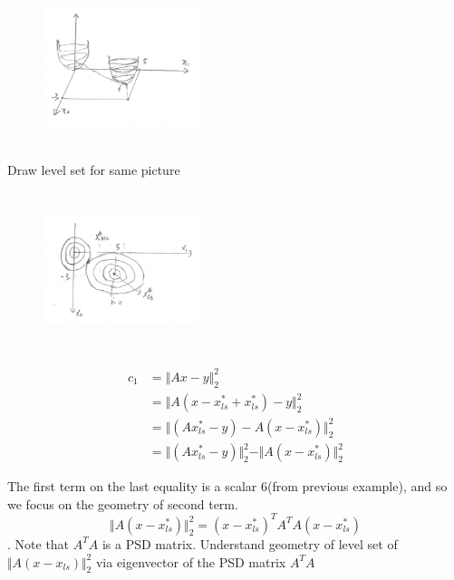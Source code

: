 \begin{figure}
	\centering
	\includegraphics[width=1.8in,height=1.8in]{figures/ch06/ch06-06.jpg}
\end{figure}

\newpage
Draw level set for same picture
\begin{figure}
	\centering
	\includegraphics[width=1.8in,height=1.8in]{figures/ch06/ch06-07.jpg}
\end{figure}

\begin{align*}
c_1
&=\Vert Ax-y\Vert^2_2\\
&=\Vert A(x-x_{ls}^*+x_{ls}^*)-y\Vert^2_2\\
&=\Vert (Ax_{ls}^*-y)-A(x-x_{ls}^*)\Vert^2_2\\
&=\Vert (Ax_{ls}^*-y)\Vert^2_2 - \Vert A(x-x_{ls}^*)\Vert^2_2
\end{align*}

The first term on the last equality is a scalar 6(from previous example), and so we focus on the geometry of second term.
$$\Vert A(x-x_{ls}^*)\Vert^2_2= (x-x_{ls}^*)^T A^TA (x-x_{ls}^*)$$. 
Note that $A^TA$ is a PSD matrix. Understand geometry of level set of $\Vert A(x-x_{ls})\Vert^2_2$ via eigenvector of the PSD matrix $A^T A$

